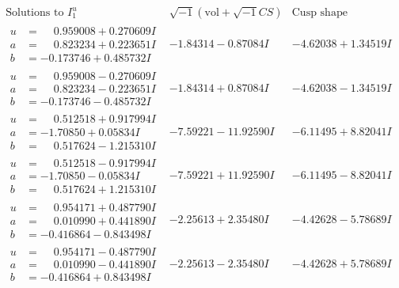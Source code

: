 \documentclass[1p]{elsarticle_modified}
\theoremstyle{definition}
\newcommand{\I}{\sqrt{-1}}
\begin{document}
$$\begin{array}{c|c|c}  
\text{Solutions to }I^u_{1}& \I (\text{vol} + \sqrt{-1}CS) & \text{Cusp shape}\\
 \hline 
\begin{aligned}
u &= \phantom{-}0.959008 + 0.270609 I \\
a &= \phantom{-}0.823234 + 0.223651 I \\
b &= -0.173746 + 0.485732 I\end{aligned}
 & -1.84314 - 0.87084 I & -4.62038 + 1.34519 I \\ \hline\begin{aligned}
u &= \phantom{-}0.959008 - 0.270609 I \\
a &= \phantom{-}0.823234 - 0.223651 I \\
b &= -0.173746 - 0.485732 I\end{aligned}
 & -1.84314 + 0.87084 I & -4.62038 - 1.34519 I \\ \hline\begin{aligned}
u &= \phantom{-}0.512518 + 0.917994 I \\
a &= -1.70850 + 0.05834 I \\
b &= \phantom{-}0.517624 - 1.215310 I\end{aligned}
 & -7.59221 - 11.92590 I & -6.11495 + 8.82041 I \\ \hline\begin{aligned}
u &= \phantom{-}0.512518 - 0.917994 I \\
a &= -1.70850 - 0.05834 I \\
b &= \phantom{-}0.517624 + 1.215310 I\end{aligned}
 & -7.59221 + 11.92590 I & -6.11495 - 8.82041 I \\ \hline\begin{aligned}
u &= \phantom{-}0.954171 + 0.487790 I \\
a &= \phantom{-}0.010990 + 0.441890 I \\
b &= -0.416864 - 0.843498 I\end{aligned}
 & -2.25613 + 2.35480 I & -4.42628 - 5.78689 I \\ \hline\begin{aligned}
u &= \phantom{-}0.954171 - 0.487790 I \\
a &= \phantom{-}0.010990 - 0.441890 I \\
b &= -0.416864 + 0.843498 I\end{aligned}
 & -2.25613 - 2.35480 I & -4.42628 + 5.78689 I \\ \hline\begin{aligned}

\end{aligned}
\end{array}$$
\end{document}
